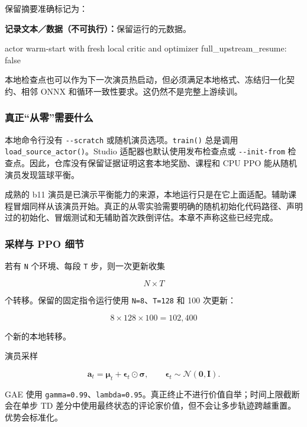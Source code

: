 \documentclass[
  chinese,
  11pt,
  letterpaper,
]{article}
\newenvironment{Shaded}{\begin{snugshade}}{\end{snugshade}}
\newcommand{\NormalTok}[1]{#1}
\renewenvironment{Shaded}{\par\smallskip}{\par\smallskip}
\begin{document}
保留摘要准确标记为：

\textbf{记录文本／数据（不可执行）：}保留运行的元数据。

\begin{Shaded}
\begin{Highlighting}[]
\NormalTok{actor warm{-}start with fresh local critic and optimizer}
\NormalTok{full\_upstream\_resume: false}
\end{Highlighting}
\end{Shaded}

本地检查点也可以作为下一次演员热启动，但必须满足本地格式、冻结归一化契约、相邻
ONNX 和循环一致性要求。这仍然不是完整上游续训。

\subsubsection{真正``从零''需要什么}\label{ux771fux6b63ux4eceux96f6ux9700ux8981ux4ec0ux4e48}

本地命令行没有 \texttt{-\/-scratch} 或随机演员选项。\texttt{train()}
总是调用 \texttt{load\_source\_actor()}。Studio
适配器也默认使用发布检查点或 \texttt{-\/-init-from}
检查点。因此，仓库没有保留证据证明这套本地奖励、课程和 CPU PPO
能从随机演员发现篮球平衡。

成熟的 b11
演员是已演示平衡能力的来源，本地运行只是在它上面适配。辅助课程冒烟同样从该演员开始。真正的从零实验需要明确的随机初始化代码路径、声明过的初始化、冒烟测试和无辅助首次跌倒评估。本章不声称这些已经完成。

\subsubsection{采样与 PPO
细节}\label{ux91c7ux6837ux4e0e-ppo-ux7ec6ux8282}

若有 \texttt{N} 个环境、每段 \texttt{T} 步，则一次更新收集

\[
N\times T
\]

个转移。保留的固定指令运行使用 \texttt{N=8}、\texttt{T=128} 和 100
次更新：

\[
8\times128\times100=102{,}400
\]

个新的本地转移。

演员采样

\[
\mathbf a_t
=\boldsymbol\mu_t+\boldsymbol\epsilon_t\odot\boldsymbol\sigma,
\qquad
\boldsymbol\epsilon_t\sim\mathcal N(\mathbf0,\mathbf I).
\]

GAE 使用
\texttt{gamma=0.99}、\texttt{lambda=0.95}。真正终止不进行价值自举；时间上限截断会在单步
TD
差分中使用最终状态的评论家价值，但不会让多步轨迹跨越重置。优势会标准化。
\end{document}
